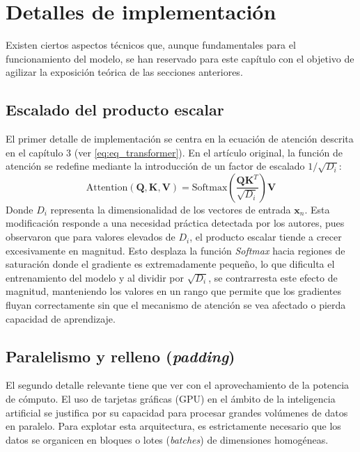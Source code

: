 \section{Detalles de implementación}

Existen ciertos aspectos técnicos que, aunque fundamentales para el funcionamiento del modelo, se han reservado para este capítulo con el 
objetivo de agilizar la exposición teórica de las secciones anteriores.

\subsection{Escalado del producto escalar}

El primer detalle de implementación se centra en la ecuación de atención descrita en el capítulo 3 (ver \ref{eq:eq_transformer}). En el artículo 
original, la función de atención se redefine mediante la introducción de un factor de escalado $1/\sqrt{D_i}$:
\begin{equation}
    \text{Attention}(\mathbf{Q}, \mathbf{K}, \mathbf{V}) = \text{Softmax} \left( \frac{\mathbf{Q} \mathbf{K}^T}{\sqrt{D_i}} \right) \mathbf{V}
    \label{eq:eq_transformer_scaled}
\end{equation}
Donde $D_i$ representa la dimensionalidad de los vectores de entrada $\mathbf{x}_n$. Esta modificación responde a una necesidad práctica 
detectada por los autores, pues observaron que para valores elevados de $D_i$, el producto escalar tiende a crecer excesivamente en magnitud. 
Esto desplaza la función \textit{Softmax} hacia regiones de saturación donde el gradiente es extremadamente pequeño, lo que dificulta el 
entrenamiento del modelo y al dividir por $\sqrt{D_i}$, se contrarresta este efecto de magnitud, manteniendo los valores en un rango que permite 
que los gradientes fluyan correctamente sin que el mecanismo de atención se vea afectado o pierda capacidad de aprendizaje.

\subsection{Paralelismo y relleno (\textit{padding})}

El segundo detalle relevante tiene que ver con el aprovechamiento de la potencia de cómputo. El uso de tarjetas gráficas (GPU) en el ámbito de 
la inteligencia artificial se justifica por su capacidad para procesar grandes volúmenes de datos en paralelo. Para explotar esta arquitectura, 
es estrictamente necesario que los datos se organicen en bloques o lotes (\textit{batches}) de dimensiones homogéneas. 

